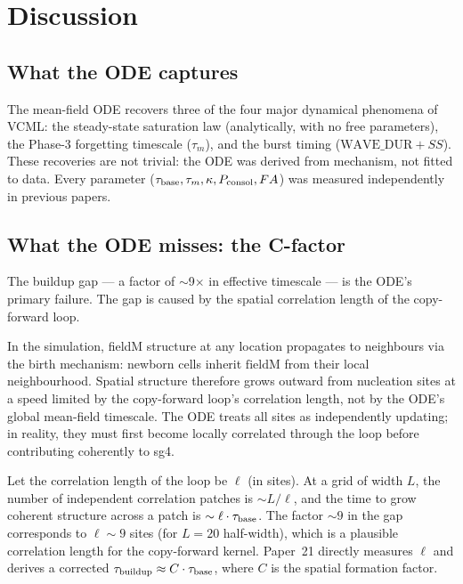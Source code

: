 \documentclass[11pt]{article}
\begin{document}
\section{Discussion}

\subsection{What the ODE captures}

The mean-field ODE recovers three of the four major dynamical phenomena of VCML:
the steady-state saturation law (analytically, with no free parameters),
the Phase-3 forgetting timescale ($\tau_m$), and
the burst timing ($\mathrm{WAVE\_DUR} + SS$).
These recoveries are not trivial: the ODE was derived from mechanism, not fitted to data.
Every parameter ($\tau_{\rm base}, \tau_m, \kappa, P_{\rm consol}, FA$) was measured
independently in previous papers.

\subsection{What the ODE misses: the C-factor}

The buildup gap --- a factor of $\sim$9$\times$ in effective timescale --- is the ODE's
primary failure.
The gap is caused by the spatial correlation length of the copy-forward loop.

In the simulation, fieldM structure at any location propagates to neighbours via the
birth mechanism: newborn cells inherit $\mathrm{fieldM}$ from their local neighbourhood.
Spatial structure therefore grows outward from nucleation sites at a speed limited by
the copy-forward loop's correlation length, not by the ODE's global mean-field timescale.
The ODE treats all sites as independently updating; in reality, they must first become
locally correlated through the loop before contributing coherently to sg4.

Let the correlation length of the loop be $\ell$ (in sites).
At a grid of width $L$, the number of independent correlation patches is $\sim L/\ell$,
and the time to grow coherent structure across a patch is $\sim \ell \cdot \tau_{\rm base}$.
The factor $\sim 9$ in the gap corresponds to $\ell \sim 9$ sites (for $L = 20$ half-width),
which is a plausible correlation length for the copy-forward kernel.
Paper~21 directly measures $\ell$ and derives a corrected $\tau_{\rm buildup} \approx C \cdot \tau_{\rm base}$,
where $C$ is the spatial formation factor.
\end{document}
